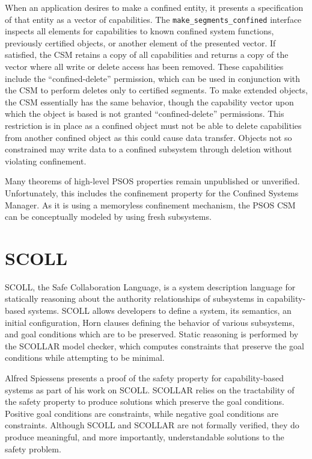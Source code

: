 When an application desires to make a confined entity, it presents a specification of that entity as a vector of capabilities.
The {\tt make\_segments\_confined} interface inspects all elements for capabilities to known confined system functions, previously certified objects, or another element of the presented vector.
If satisfied, the CSM retains a copy of all capabilities and returns a copy of the vector where all write or delete access has been removed.
These capabilities include the ``confined-delete'' permission, which can be used in conjunction with the CSM to perform deletes only to certified segments.
To make extended objects, the CSM essentially has the same behavior, though the capability vector upon which the object is based is not granted ``confined-delete'' permissions.
This restriction is in place as a confined object must not be able to delete capabilities from another confined object as this could cause data transfer.
Objects not so constrained may write data to a confined subsystem through deletion without violating confinement.

Many theorems of high-level PSOS properties remain unpublished or unverified.
Unfortunately, this includes the confinement property for the Confined Systems Manager.
As it is using a memoryless confinement mechanism, the PSOS CSM can be conceptually modeled by \TMmodelName{} using fresh subsystems.

\section{SCOLL}

SCOLL, the Safe Collaboration Language, is a system description language for statically reasoning about the authority relationships of subsystems in capability-based systems. \cite{Jaradin05scoll}
SCOLL allows developers to define a system, its semantics, an initial configuration, Horn clauses defining the behavior of various subsystems, and goal conditions which are to be preserved.
Static reasoning is performed by the SCOLLAR model checker, which computes constraints that preserve the goal conditions while attempting to be minimal.

Alfred Spiessens presents a proof of the safety property for capability-based systems as part of his work on SCOLL.\cite{Spiessens07patternsof}
SCOLLAR relies on the tractability of the safety property to produce solutions which preserve the goal conditions.
Positive goal conditions are  constraints, while negative goal conditions are  constraints.
Although SCOLL and SCOLLAR are not formally verified, they do produce meaningful, and more importantly, understandable solutions to the safety problem.

